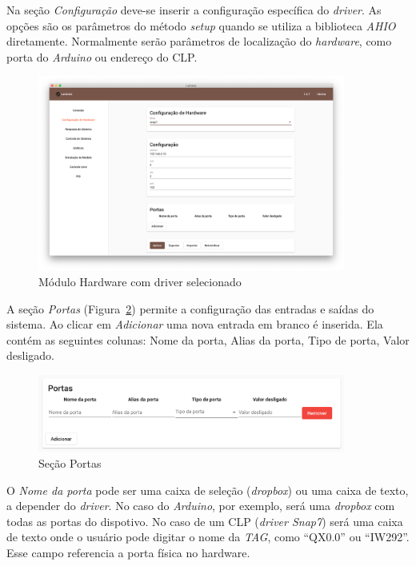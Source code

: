 Na seção \textit{Configuração} deve-se inserir a configuração específica do
\textit{driver}. As opções são os parâmetros do método \textit{setup} quando se
utiliza a biblioteca \textit{AHIO} diretamente. Normalmente serão parâmetros de
localização do \textit{hardware}, como porta do \textit{Arduino} ou endereço do
CLP\@.

\begin{figure}[ht!]
    \centering
    \includegraphics[width=0.9\textwidth]{imgs/hardware2}
    \caption[Módulo Hardware com driver selecionado]{Módulo Hardware com driver selecionado}%
    \label{fig:hardware2}
\end{figure}

A seção \textit{Portas} (Figura~\ref{fig:hardware3}) permite a configuração das
entradas e saídas do sistema. Ao clicar em \textit{Adicionar} uma nova entrada
em branco é inserida. Ela contém as seguintes colunas: Nome da porta, Alias da
porta, Tipo de porta, Valor desligado.

\begin{figure}[ht!]
    \centering
    \includegraphics[width=0.9\textwidth]{imgs/hardware3}
    \caption[Seção Portas]{Seção Portas}%
    \label{fig:hardware3}
\end{figure}

O \textit{Nome da porta} pode ser uma caixa de seleção (\textit{dropbox}) ou uma
caixa de texto, a depender do \textit{driver}. No caso do \textit{Arduino}, por
exemplo, será uma \textit{dropbox} com todas as portas do dispotivo. No caso de
um CLP (\textit{driver Snap7}) será uma caixa de texto onde o usuário pode
digitar o nome da \textit{TAG}, como \enquote{QX0.0} ou \enquote{IW292}. Esse
campo referencia a porta física no hardware.

